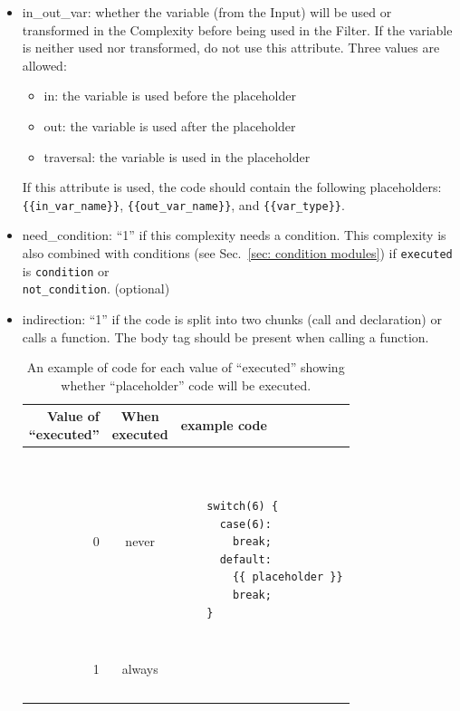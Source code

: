 \begin{itemize}
    \item in\_out\_var: whether the variable (from the Input) will be used or
    transformed in the Complexity before being used in the Filter.  If the
    variable is neither used nor transformed, do not use this attribute.
    Three values are allowed:
    \begin{itemize}[nosep]
        \item in: the variable is used before the placeholder
        \item out: the variable is used after the placeholder
        \item traversal: the variable is used in the placeholder
    \end{itemize}
    If this attribute is used, the code should contain the following
    placeholders: \\
    \verb|{{in_var_name}}|, \verb|{{out_var_name}}|, and \verb|{{var_type}}|.

    \item need\_condition: ``1'' if this complexity needs a condition.
      This complexity is also combined with conditions (see
      Sec.~\ref{sec: condition modules}) if \verb|executed| is \verb|condition|
      or \\ \verb|not_condition|. (optional)

    \item indirection: ``1'' if the code is split into two chunks (call and
    declaration) or calls a function.  The body tag should be present when
    calling a function.

    \begin{table}[H]
    \centering
    \caption{An example of code for each value of ``executed'' showing whether
      ``placeholder'' code will be executed.}
    \begin{tabular}{|r|c|l|}
    \hline
      \makecell{Value of \\ ``executed''} &
      \makecell{When \\ executed} &
      example code \\
    \hline
    0 &
    never &
    \begin{minipage}{3in}
    \begin{verbatim}


    switch(6) {
      case(6):
        break;
      default:
        {{ placeholder }}
        break;
    }
    \end{verbatim}
    \end{minipage}
    \\
    \hline
    1 &
    always &
    \begin{minipage}{3in}
    \begin{verbatim}



\end{verbatim}
\end{minipage}
\end{tabular}
\end{table}
\end{itemize}
